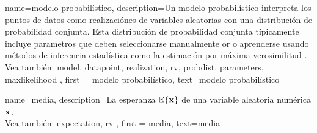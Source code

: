 {
	name=modelo probabilístico,
	description={Un modelo probabilístico interpreta los puntos de datos
		como realizaciónes de variables aleatorias con una distribución de probabilidad conjunta. Esta distribución de probabilidad conjunta típicamente 
		incluye parametros que deben seleccionarse manualmente or o aprenderse usando métodos de inferencia estadística  
		como la estimación por máxima verosimilitud \cite{LC}.
		\\
		Vea también: \gls{model}, \gls{datapoint}, \gls{realization}, \gls{rv}, \gls{probdist}, \gls{parameters}, \gls{maxlikelihood} }, 
	first = {modelo probabilístico}, text={modelo probabilístico} 
}



{
	name=media,
	description={La esperanza $\mathbb{E} \{ {\bf x} \}$ de una variable aleatoria numérica ${\bf x}$.
	\\
		Vea también: \gls{expectation}, \gls{rv} }, 
		first = {media}, text={media} 
}
